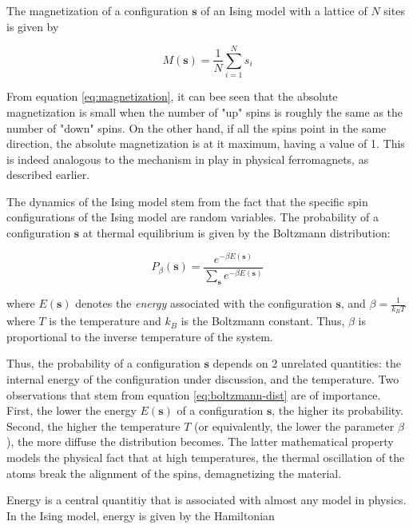 \documentclass[12pt]{article}
\begin{document}
The magnetization of a configuration $\boldsymbol{s}$ of an Ising model with a lattice of $N$ sites is given by 

\begin{equation}
M(\boldsymbol{s}) = \frac{1}{N} \sum_{i=1}^N s_i
\label{eq:magnetization}
\end{equation}

From equation \ref{eq:magnetization}, it can bee seen that the absolute magnetization is small when the number of "up" spins is roughly the same as the number of "down" spins. On the other hand, if all the spins point in the same direction, the absolute magnetization is at it maximum, having a value of 1. This is indeed analogous to the mechanism in play in physical ferromagnets, as described earlier. 

The dynamics of the Ising model stem from the fact that the specific spin configurations of the Ising model are random variables. The probability of a configuration $\boldsymbol{s}$ at thermal equilibrium is given by the Boltzmann distribution: 

\begin{equation}
P_\beta(\boldsymbol{s}) = \frac{e^{-\beta E(\boldsymbol{s})}}{\sum_{\boldsymbol{s}} e^{-\beta E(\boldsymbol{s})}}
\label{eq:boltzmann-dist}
\end{equation}

where $E(\boldsymbol{s})$ denotes the \textit{energy} associated with the configuration $\boldsymbol{s}$, and $\beta = \frac{1}{k_B T}$ where $T$ is the temperature and $k_B$ is the Boltzmann constant. Thus, $\beta$ is proportional to the inverse temperature of the system.  

Thus, the probability of a configuration $\boldsymbol{s}$ depends on 2 unrelated quantities: the internal energy of the configuration under discussion, and the temperature. Two observations that stem from equation \ref{eq:boltzmann-dist} are of importance. First, the lower the energy $E(\boldsymbol{s})$ of a configuration $\boldsymbol{s}$, the higher its probability. Second, the higher the temperature $T$ (or equivalently, the lower the parameter $\beta$), the more diffuse the distribution becomes. The latter mathematical property models the physical fact that at high temperatures, the thermal oscillation of the atoms break the alignment of the spins, demagnetizing the material. 

Energy is a central quantitiy that is associated with almost any model in physics. In the Ising model, energy is given by the Hamiltonian
\end{document}
